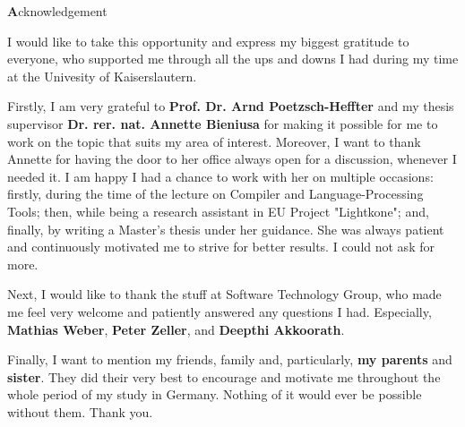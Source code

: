 
\begin{center}
{\Large \textbf Acknowledgement}
\end{center}
\vspace{1cm}

I would like to take this opportunity and express my biggest gratitude to everyone, who supported me through all the ups and downs I had during my time at the Univesity of Kaiserslautern. 

Firstly, I am very grateful to \textbf{Prof. Dr. Arnd Poetzsch-Heffter} and my thesis supervisor \textbf{Dr. rer. nat. Annette Bieniusa} for making it possible for me to work on the topic that suits my area of interest. Moreover, I want to thank Annette for having the door to her office always open for a discussion, whenever I needed it. I am happy I had a chance to work with her on multiple occasions: firstly, during the time of the lecture on Compiler and Language-Processing Tools; then, while being a research assistant in EU Project "Lightkone"; and, finally, by writing a Master's thesis under her guidance. She was always patient and continuously motivated me to strive for better results. I could not ask for more.

Next, I would like to thank the stuff at Software Technology Group, who made me feel very welcome and patiently answered any questions I had. Especially, \textbf{Mathias Weber}, \textbf{Peter Zeller}, and \textbf{Deepthi Akkoorath}.

Finally, I want to mention my friends, family and, particularly, \textbf{my parents} and \textbf{sister}. They did their very best to encourage and motivate me throughout the whole period of my study in Germany. Nothing of it would ever be possible without them. Thank you.